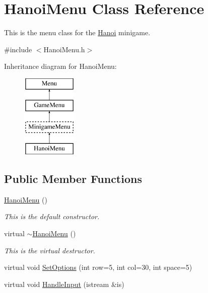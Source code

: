 \hypertarget{classHanoiMenu}{\section{Hanoi\-Menu Class Reference}
\label{classHanoiMenu}
}


This is the menu class for the \hyperlink{classHanoi}{Hanoi} minigame.  




{\ttfamily \#include $<$Hanoi\-Menu.\-h$>$}

Inheritance diagram for Hanoi\-Menu\-:\begin{figure}[H]
\begin{center}
\leavevmode
\includegraphics[height=4.000000cm]{classHanoiMenu}
\end{center}
\end{figure}
\subsection*{Public Member Functions}
\begin{DoxyCompactItemize}
\item 
\hyperlink{classHanoiMenu_a77aa5dc29b4c2954983e0471b8421d57}{Hanoi\-Menu} ()
\begin{DoxyCompactList}\small\item\em This is the default constructor. \end{DoxyCompactList}\item 
virtual \hyperlink{classHanoiMenu_a8c69e463f6d6cd406cfed43a8d29bc2e}{$\sim$\-Hanoi\-Menu} ()
\begin{DoxyCompactList}\small\item\em This is the virtual destructor. \end{DoxyCompactList}\item 
virtual void \hyperlink{classHanoiMenu_a0280d0e443642407fda5903346be1a39}{Set\-Options} (int row=5, int col=30, int space=5)
\item 
virtual void \hyperlink{classHanoiMenu_a8f85bae3166bf122c5800aab41c87d54}{Handle\-Input} (istream \&is)
\end{DoxyCompactItemize}
